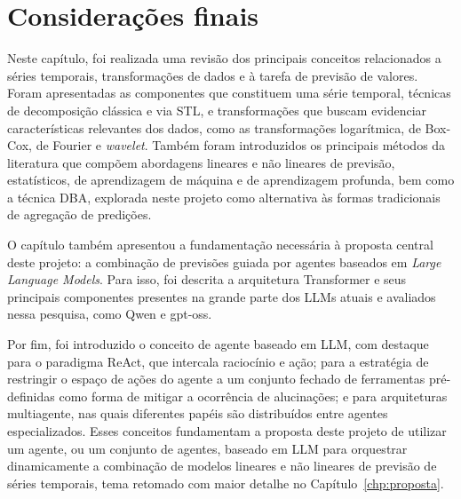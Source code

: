 \section{Considerações finais}

Neste capítulo, foi realizada uma revisão dos principais conceitos relacionados a séries temporais, transformações de dados e à tarefa de previsão de valores. Foram apresentadas as componentes que constituem uma série temporal, técnicas de decomposição clássica e via STL, e transformações que buscam evidenciar características relevantes dos dados, como as transformações logarítmica, de Box-Cox, de Fourier e \textit{wavelet}. Também foram introduzidos os principais métodos da literatura que compõem abordagens lineares e não lineares de previsão, estatísticos, de aprendizagem de máquina e de aprendizagem profunda, bem como a técnica DBA, explorada neste projeto como alternativa às formas tradicionais de agregação de predições.

O capítulo também apresentou a fundamentação necessária à proposta central deste projeto: a combinação de previsões guiada por agentes baseados em \textit{Large Language Models}. Para isso, foi descrita a arquitetura Transformer e seus principais componentes presentes na grande parte dos LLMs atuais e avaliados nessa pesquisa, como Qwen e gpt-oss.

Por fim, foi introduzido o conceito de agente baseado em LLM, com destaque para o paradigma ReAct, que intercala raciocínio e ação; para a estratégia de restringir o espaço de ações do agente a um conjunto fechado de ferramentas pré-definidas como forma de mitigar a ocorrência de alucinações; e para arquiteturas multiagente, nas quais diferentes papéis são distribuídos entre agentes especializados. Esses conceitos fundamentam a proposta deste projeto de utilizar um agente, ou um conjunto de agentes, baseado em LLM para orquestrar dinamicamente a combinação de modelos lineares e não lineares de previsão de séries temporais, tema retomado com maior detalhe no Capítulo~\ref{chp:proposta}.

